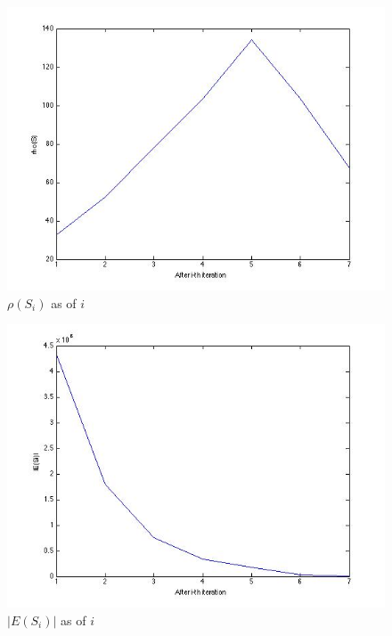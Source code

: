 \documentclass{article}
\begin{document}
\begin{figure}[H]
\centering
\includegraphics[scale=0.5]{q4-RhoSi.jpg}
\caption{ $\rho(S_i)$ as of $i$ }
\label{}
\end{figure}


\begin{figure}[H]
\centering
\includegraphics[scale=0.5]{q4-ESi.jpg}
\caption{ $|E(S_i)|$ as of $i$ }
\label{}
\end{figure}
\end{document}
